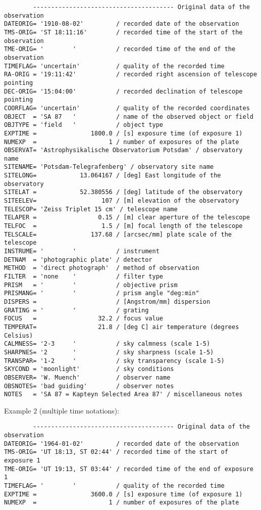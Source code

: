 \documentclass[11pt]{ivoa}
\begin{document}
\begin{lstlisting}
        --------------------------------------- Original data of the observation
DATEORIG= '1910-08-02'         / recorded date of the observation
TMS-ORIG= 'ST 18:11:16'        / recorded time of the start of the observation
TME-ORIG= '        '           / recorded time of the end of the observation
TIMEFLAG= 'uncertain'          / quality of the recorded time
RA-ORIG = '19:11:42'           / recorded right ascension of telescope pointing
DEC-ORIG= '15:04:00'           / recorded declination of telescope pointing
COORFLAG= 'uncertain'          / quality of the recorded coordinates
OBJECT  = 'SA 87   '           / name of the observed object or field
OBJTYPE = 'field   '           / object type
EXPTIME =               1800.0 / [s] exposure time (of exposure 1)
NUMEXP  =                    1 / number of exposures of the plate
OBSERVAT= 'Astrophysikalische Observatorium Potsdam' / observatory name
SITENAME= 'Potsdam-Telegrafenberg' / observatory site name
SITELONG=            13.064167 / [deg] East longitude of the observatory
SITELAT =            52.380556 / [deg] latitude of the observatory
SITEELEV=                  107 / [m] elevation of the observatory
TELESCOP= 'Zeiss Triplet 15 cm' / telescope name
TELAPER =                 0.15 / [m] clear aperture of the telescope
TELFOC  =                  1.5 / [m] focal length of the telescope
TELSCALE=               137.68 / [arcsec/mm] plate scale of the telescope
INSTRUME= '        '           / instrument
DETNAM  = 'photographic plate' / detector
METHOD  = 'direct photograph'  / method of observation
FILTER  = 'none    '           / filter type
PRISM   = '        '           / objective prism
PRISMANG= '        '           / prism angle "deg:min"
DISPERS =                      / [Angstrom/mm] dispersion
GRATING = '        '           / grating
FOCUS   =                 32.2 / focus value
TEMPERAT=                 21.8 / [deg C] air temperature (degrees Celsius)
CALMNESS= '2-3     '           / sky calmness (scale 1-5)
SHARPNES= '2       '           / sky sharpness (scale 1-5)
TRANSPAR= '1-2     '           / sky transparency (scale 1-5)
SKYCOND = 'moonlight'          / sky conditions
OBSERVER= 'W. Muench'          / observer name
OBSNOTES= 'bad guiding'        / observer notes
NOTES   = 'SA 87 = Kapteyn Selected Area 87' / miscellaneous notes
\end{lstlisting}

Example 2 (multiple time notations):

\begin{lstlisting}
        --------------------------------------- Original data of the observation
DATEORIG= '1964-01-02'         / recorded date of the observation
TMS-ORIG= 'UT 18:13, ST 02:44' / recorded time of the start of exposure 1
TME-ORIG= 'UT 19:13, ST 03:44' / recorded time of the end of exposure 1
TIMEFLAG= '        '           / quality of the recorded time
EXPTIME =               3600.0 / [s] exposure time (of exposure 1)
NUMEXP  =                    1 / number of exposures of the plate
\end{lstlisting}
\end{document}
